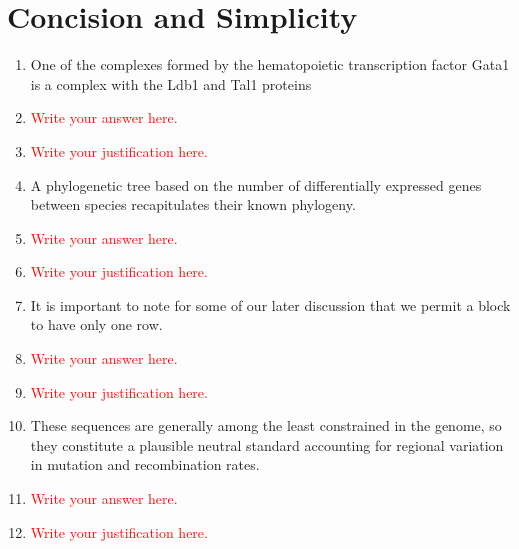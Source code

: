 \documentclass{article}
\newcommand{\red}[1]{\textcolor{red}{#1}}
\begin{document}
\section{Concision and Simplicity}
\begin{enumerate}
    
    \item One of the complexes formed by the hematopoietic transcription factor Gata1 is a complex with the Ldb1 and Tal1 proteins
    \item[] \red{Write your answer here.}
    \item[] \red{Write your justification here.}
    
    \item A phylogenetic tree based on the number of differentially expressed genes between species recapitulates their known phylogeny.
    \item[] \red{Write your answer here.}
    \item[] \red{Write your justification here.}
    
    \item It is important to note for some of our later discussion that we permit a block to have only one row. 
    \item[] \red{Write your answer here.}
    \item[] \red{Write your justification here.}
    
    \item These sequences are generally among the least constrained in the genome, so they constitute a plausible neutral standard accounting for regional variation in mutation and recombination rates.
    \item[] \red{Write your answer here.}
    \item[] \red{Write your justification here.}
    
\end{enumerate}
\end{document}
